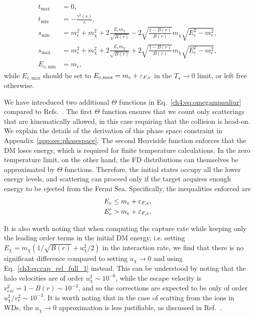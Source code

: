 \begin{align}
t_\mathrm{max} &= 0,\\
t_\mathrm{min} &= -\frac{\gamma^2(s)}{s},\\
s_\mathrm{min} &= m_e^2+m_\chi^2 + 2\frac{E_e m_\chi}{\sqrt{B(r)}}-2\sqrt{\frac{1-B(r)}{B(r)}}m_\chi\sqrt{E_e^2-m_e^2},\label{ch4:eq:smin}\\
s_\mathrm{max} &= m_e^2+m_\chi^2 + 2\frac{E_e m_\chi}{\sqrt{B(r)}}+2\sqrt{\frac{1-B(r)}{B(r)}}m_\chi\sqrt{E_e^2-m_e^2}\label{ch4:eq:smax},\\
E_{e,\mathrm{min}} &= m_e,
\end{align}
while $E_{e,\mathrm{max}}$ should be set to $E_{e,\mathrm{max}}=m_e+\varepsilon_{F,e}$ in the $T_\star\rightarrow0$ limit, or left free otherwise. 


We have introduced two additional $\Theta$ functions in Eq.~\ref{ch4:eq:omegampauliur} compared to Refs.~\cite{Bell:2020jou_sep_ImprovedTreatmentDark,Bell:2020lmm_mar_ImprovedTreatmentDark}. 
The first $\Theta$ function ensures that we count only scatterings that are kinematically allowed, in this case requiring that the collision is head-on. 
We explain the details of the derivation of this phase space constraint in Appendix~\ref{app:sec:phasespace}. 
The second Heaviside function enforces that the DM loses energy, which is required for finite temperature calculations. 
In the zero temperature limit, on the other hand, the FD distributions can themselves be approximated by $\Theta$ functions. Therefore, the initial states occupy all the lower energy levels, and scattering can proceed only if the target acquires enough energy to be ejected from the Fermi Sea. 
Specifically, the  inequalities enforced are
\begin{align}
E_e &\le m_e +\varepsilon_{F,e},\\
E_e' &> m_e +\varepsilon_{F,e}.
\end{align}

It is also worth noting that when computing the capture rate while keeping only the leading order terms in the initial DM energy, i.e. setting $E_\chi = m_\chi(1/\sqrt{B(r)} + u_\chi^2/2)$ in the interaction rate, we find that there is no significant difference compared to setting $u_\chi \rightarrow 0$ and using Eq.~\ref{ch3:eq:cap_rel_full_1} instead. This can be understood by noting that the halo velocities are of order $u_\chi^2\sim 10^{-6}$, while the escape velocity is $v_{esc}^2 = 1 - B(r) \sim 10^{-3}$, and so the corrections are expected to be only of order $u_\chi^2/v_e^2  \sim 10^{-3}$.  It is worth noting that in the case of scatting from the ions in WDs, the $u_\chi \rightarrow 0$ approximation is less justifiable, as discussed in Ref.~\cite{Bell:2021fye_oct_Improvedtreatmentdark}.

